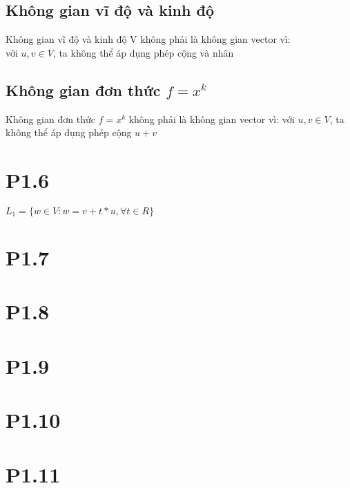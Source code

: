 \documentclass[a4paper,11pt]{article}
\theoremstyle{mytheor}
\begin{document}
\subsection*{Không gian vĩ độ và kinh độ}
Không gian vĩ độ và kinh độ V không phải là không gian vector vì:\\
với $u, v \in V$, ta không thể áp dụng phép cộng và nhân
\subsection*{Không gian đơn thức $f=x^k$}
Không gian đơn thức $f=x^k$ không phải là không gian vector vì:
với $u, v \in V$, ta không thể áp dụng phép cộng $u+v$

\section*{P1.6}
$L_1 = \{ w \in V : w = v+t*u, \forall t \in R \}$ 
\\

\section*{P1.7}
\section*{P1.8}
\section*{P1.9}
\section*{P1.10}
\section*{P1.11}
\end{document}

